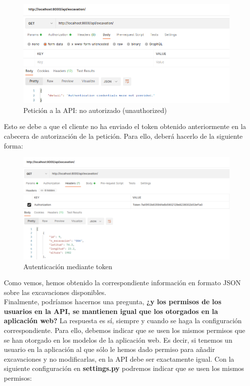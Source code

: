     \begin{figure}[H]
        \centering
        \includegraphics[scale=0.45]{imagenes/unauthorized2.png}
        \caption{Petición a la API: no autorizado (unauthorized)}
        \label{fig:unauthorized2}
    \end{figure}

Esto se debe a que el cliente no ha enviado el token obtenido anteriormente en la
cabecera de autorización de la petición. Para ello, deberá hacerlo de la siguiente
forma:

    \begin{figure}[H]
        \centering
        \includegraphics[scale=0.38]{imagenes/token-auth.png}
        \caption{Autenticación mediante token}
        \label{fig:token-auth}
    \end{figure}

Como vemos, hemos obtenido la correspondiente información en formato JSON sobre las
excavaciones disponibles.\\

Finalmente, podríamos hacernos una pregunta, \textbf{¿y los permisos de los usuarios en la
API, se mantienen igual que los otorgados en la aplicación web?} La respuesta es sí, siempre
y cuando se haga la configuración correspondiente. Para ello, debemos indicar que se usen
los mismos permisos que se han otorgado en los modelos de la aplicación web. Es decir, si
tenemos un usuario en la aplicación al que sólo le hemos dado permiso para añadir excavaciones
y no modificarlas, en la API debe ser exactamente igual. Con la siguiente configuración en
\textbf{settings.py} podremos indicar que se usen los mismos permisos:

